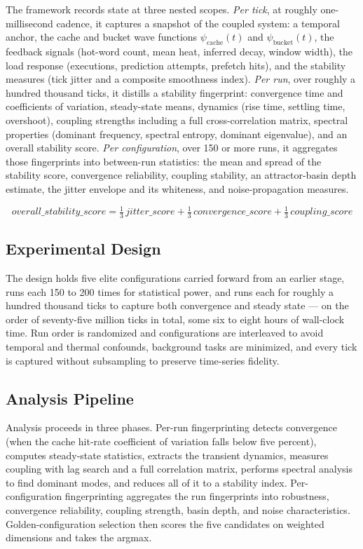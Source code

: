 The framework records state at three nested scopes. \emph{Per tick}, at roughly
one-millisecond cadence, it captures a snapshot of the coupled system: a temporal
anchor, the cache and bucket wave functions $\psi_{\text{cache}}(t)$ and
$\psi_{\text{bucket}}(t)$, the feedback signals (hot-word count, mean heat,
inferred decay, window width), the load response (executions, prediction
attempts, prefetch hits), and the stability measures (tick jitter and a composite
smoothness index). \emph{Per run}, over roughly a hundred thousand ticks, it
distills a stability fingerprint: convergence time and coefficients of variation,
steady-state means, dynamics (rise time, settling time, overshoot), coupling
strengths including a full cross-correlation matrix, spectral properties
(dominant frequency, spectral entropy, dominant eigenvalue), and an overall
stability score. \emph{Per configuration}, over 150 or more runs, it aggregates
those fingerprints into between-run statistics: the mean and spread of the
stability score, convergence reliability, coupling stability, an attractor-basin
depth estimate, the jitter envelope and its whiteness, and noise-propagation
measures.

\begin{equation}
\textit{overall\_stability\_score} =
  \tfrac{1}{3}\,\textit{jitter\_score}
+ \tfrac{1}{3}\,\textit{convergence\_score}
+ \tfrac{1}{3}\,\textit{coupling\_score}
\end{equation}

\subsection{Experimental Design}

The design holds five elite configurations carried forward from an earlier stage,
runs each 150 to 200 times for statistical power, and runs each for roughly a
hundred thousand ticks to capture both convergence and steady state --- on the
order of seventy-five million ticks in total, some six to eight hours of
wall-clock time. Run order is randomized and configurations are interleaved to
avoid temporal and thermal confounds, background tasks are minimized, and every
tick is captured without subsampling to preserve time-series fidelity.

\subsection{Analysis Pipeline}

Analysis proceeds in three phases. Per-run fingerprinting detects convergence
(when the cache hit-rate coefficient of variation falls below five percent),
computes steady-state statistics, extracts the transient dynamics, measures
coupling with lag search and a full correlation matrix, performs spectral
analysis to find dominant modes, and reduces all of it to a stability index.
Per-configuration fingerprinting aggregates the run fingerprints into robustness,
convergence reliability, coupling strength, basin depth, and noise
characteristics. Golden-configuration selection then scores the five candidates
on weighted dimensions and takes the argmax.

